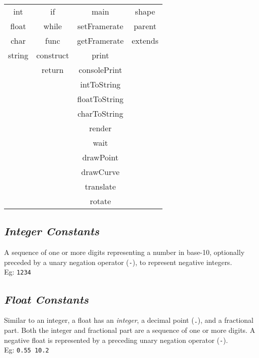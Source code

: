 \documentclass[letterpaper,12pt]{article}
\begin{document}
        \begin{center}
            \begin{tabular}{ |c|c|c|c| } 
            \hline
                int     & if            & main          & shape   \\ 
                float   & while         & setFramerate  & parent  \\ 
                char    & func          & getFramerate  & extends \\
                string  & construct     & print         & \\
                        & return        & consolePrint  & \\
                        &               & intToString   & \\
                        &               & floatToString & \\
                        &               & charToString  & \\
                        &               & render        & \\
                        &               & wait          & \\
                        &               & drawPoint     & \\
                        &               & drawCurve     & \\
                        &               & translate     & \\
                        &               & rotate        & \\

            \hline
            \end{tabular}
        \end{center}

    \subsection{\textit{Integer Constants}}
    A sequence of one or more digits representing a number in base-10, optionally preceded by a unary negation operator (\texttt{-}), to represent negative integers.\\
    Eg: \texttt{1234}

    \subsection{\textit{Float Constants}}
    Similar to an integer, a float has an \textit{integer}, a decimal point (\texttt{.}), and a fractional part. Both the integer and fractional part are a sequence of one or more digits. A negative float is represented by a preceding unary negation operator (\texttt{-}).\\
    Eg: \texttt{0.55  10.2}
\end{document}
